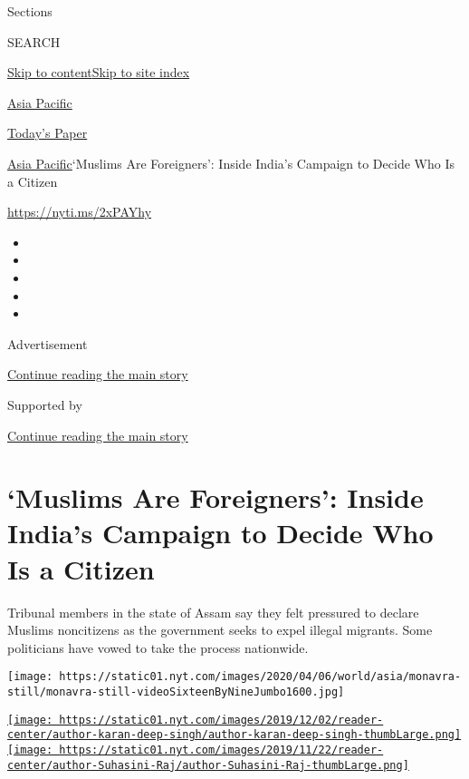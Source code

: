 Sections

SEARCH

\protect\hyperlink{site-content}{Skip to
content}\protect\hyperlink{site-index}{Skip to site index}

\href{https://www.nytimes.com/section/world/asia}{Asia Pacific}

\href{https://myaccount.nytimes.com/auth/login?response_type=cookie\&client_id=vi}{}

\href{https://www.nytimes.com/section/todayspaper}{Today's Paper}

\href{/section/world/asia}{Asia Pacific}\textbar{}`Muslims Are
Foreigners': Inside India's Campaign to Decide Who Is a Citizen

\url{https://nyti.ms/2xPAYhy}

\begin{itemize}
\item
\item
\item
\item
\item
\end{itemize}

Advertisement

\protect\hyperlink{after-top}{Continue reading the main story}

Supported by

\protect\hyperlink{after-sponsor}{Continue reading the main story}

\hypertarget{muslims-are-foreigners-inside-indias-campaign-to-decide-who-is-a-citizen}{%
\section{`Muslims Are Foreigners': Inside India's Campaign to Decide Who
Is a
Citizen}\label{muslims-are-foreigners-inside-indias-campaign-to-decide-who-is-a-citizen}}

Tribunal members in the state of Assam say they felt pressured to
declare Muslims noncitizens as the government seeks to expel illegal
migrants. Some politicians have vowed to take the process nationwide.

\texttt{[image: https://static01.nyt.com/images/2020/04/06/world/asia/monavra-still/monavra-still-videoSixteenByNineJumbo1600.jpg]}

\href{https://www.nytimes.com/by/karan-deep-singh}{\texttt{[image: https://static01.nyt.com/images/2019/12/02/reader-center/author-karan-deep-singh/author-karan-deep-singh-thumbLarge.png]}}\href{https://www.nytimes.com/by/suhasini-raj}{\texttt{[image: https://static01.nyt.com/images/2019/11/22/reader-center/author-Suhasini-Raj/author-Suhasini-Raj-thumbLarge.png]}}

